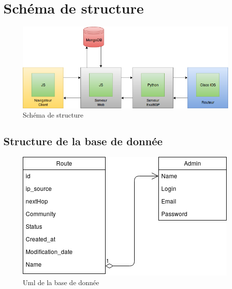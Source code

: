 \section{Schéma de structure}

\begin{figure}[h]
\includegraphics[scale = 0.75]{img/structure.png}
\caption{Schéma de structure}
\end{figure}


\subsection{Structure de la base de donnée}

\begin{center}
\begin{figure}[h]
\includegraphics[scale=0.5]{img/table_mongoDB}
\caption{Uml de la base de donnée}
\end{figure}
\end{center}

